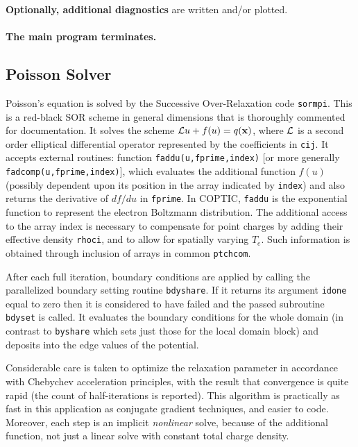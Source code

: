 \documentclass[12pt]{article}
\def\sentence#1{\par\noindent\textbf{#1}}
\begin{document}
\sentence{Optionally, additional diagnostics} are written and/or
plotted.

\paragraph{The main program terminates.}

\subsection{Poisson Solver}

Poisson's equation is solved by the Successive Over-Relaxation code
\verb!sormpi!. This is a red-black SOR scheme in general dimensions
that is thoroughly commented for documentation. It solves the scheme
${\cal L}u+f(u) = q({\bf x})$, where ${\cal L}$ is a second order
elliptical differential operator represented by the coefficients in
\verb!cij!. It accepts external routines: function
\verb!faddu(u,fprime,index)! [or more generally
\verb!fadcomp(u,fprime,index)!], which evaluates the additional
function $f(u)$ (possibly dependent upon its position in the array
indicated by \verb!index!) and also returns the derivative of $df/du$
in \verb!fprime!. In COPTIC, \verb!faddu! is the exponential function
to represent the electron Boltzmann distribution. The additional
access to the array index is necessary to compensate for point charges
by adding their effective density \verb!rhoci!, and to allow for
spatially varying $T_e$. Such information is obtained through
inclusion of arrays in common \verb!ptchcom!.

After each full iteration, boundary conditions are applied by calling
the parallelized boundary setting routine \verb!bdyshare!. If it
returns its argument \verb!idone!  equal to zero then it is
considered to have failed and the passed subroutine \verb!bdyset! is
called. It evaluates the boundary conditions for the whole domain (in
contrast to \verb!byshare! which sets just those for the local domain
block) and deposits into the edge values of the potential.

Considerable care is taken to optimize the relaxation parameter in
accordance with Chebychev acceleration principles, with the result
that convergence is quite rapid (the count of half-iterations is
reported). This algorithm is practically as fast in this application as
conjugate gradient techniques, and easier to code. Moreover, each step is an
implicit \emph{nonlinear} solve, because of the additional function,
not just a linear solve with constant total charge density.
\end{document}
